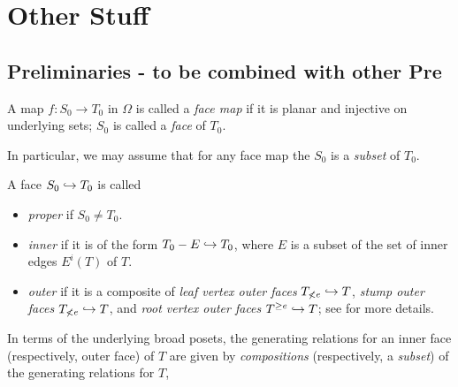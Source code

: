 \documentclass[a4paper,10pt,draft]{article}%
\begin{document}
\newpage


\section{Other Stuff}

\subsection{Preliminaries - to be combined with other Pre}







\begin{definition}
      A map $f: S_0 \to T_0$ in $\Omega$ is called a \textit{face map} if it is planar and injective on underlying sets;
      $S_0$ is called a \textit{face} of $T_0$.
\end{definition}

\begin{remark}
      In particular, we may assume that for any face map  the $S_0$ is a \textit{subset} of $T_0$.
\end{remark}

\begin{definition}
      A face $S_0 \hookrightarrow T_0$ is called
      \begin{itemize}
      \item \textit{proper} if $S_0 \neq T_0$.
      \item \textit{inner} if it is of the form $T_0 - E \hookrightarrow T_0$, where $E$ is a subset of the set of inner edges $E^i(T)$ of $T$.
      \item \textit{outer} if it is a composite of
            \textit{leaf vertex outer faces} $T_{\not< e}\hookrightarrow T$,
            \textit{stump outer faces} $T_{\not< e}\hookrightarrow T$,
            and \textit{root vertex outer faces} $T^{\geq e} \hookrightarrow T$;
            see \cite[Notation 5.41]{Per17} for more details.
      \end{itemize}
\end{definition}

\begin{remark}
      In terms of the underlying broad posets,
      the generating relations for an inner face (respectively, outer face) of $T$ are given by
      \textit{compositions} (respectively, a \textit{subset})
      of the generating relations for $T$,
\end{remark}
\end{document}
